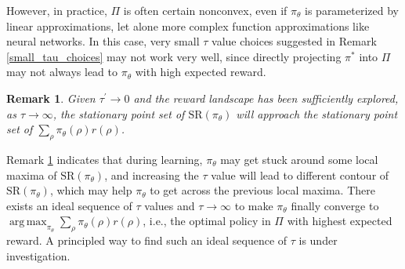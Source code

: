 \documentclass{article}
\DeclareMathOperator*\argmax{arg\,max}
\newcommand{\SR}{\text{SR}}
\newtheorem{remk}{Remark}
\begin{document}
However, in practice, $\Pi$ is often certain nonconvex, even if $\pi_\theta$ is parameterized by linear approximations, let alone more complex function approximations like neural networks. In this case, very small $\tau$ value choices suggested in Remark \ref{small_tau_choices} may not work very well, since directly projecting $\pi^*$ into $\Pi$ may not always lead to $\pi_\theta$ with high expected reward.
 
\begin{remk}
\label{large_tau_choices}
Given $\tau^{\prime} \to 0$ and the reward landscape has been sufficiently explored, as $\tau \to \infty$, the stationary point set of $\SR(\pi_\theta)$ will approach the stationary point set of $\sum_{\rho}{ \pi_\theta(\rho) r(\rho) }$.
\end{remk}

Remark \ref{large_tau_choices} indicates that during learning, $\pi_\theta$ may get stuck around some local maxima of $\SR(\pi_\theta)$, and increasing the $\tau$ value will lead to different contour of $\SR(\pi_\theta)$, which may help $\pi_\theta$ to get across the previous local maxima. There exists an ideal sequence of $\tau$ values and $\tau \to \infty$ to make $\pi_\theta$ finally converge to $\argmax_{\pi_\theta}{ \sum_{\rho}{\pi_\theta(\rho) r(\rho)} }$, i.e., the optimal policy in $\Pi$ with highest expected reward. A principled way to find such an ideal sequence of $\tau$ is under investigation.
\fi
\end{document}
